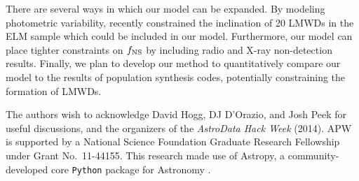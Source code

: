 \documentclass[apjl]{emulateapj}
\begin{document}
There are several ways in which our model can be expanded. By modeling photometric variability, \citet{hermes14} recently constrained the inclination of 20 LMWDs in the ELM sample which could be included in our model. Furthermore, our model can place tighter constraints on $f_{\rm NS}$ by including radio and X-ray non-detection results. Finally, we plan to develop our method to quantitatively compare our model to the results of population synthesis codes, potentially constraining the formation of LMWDs.



\acknowledgements
The authors wish to acknowledge David Hogg, DJ D'Orazio, and Josh Peek for useful discussions, and the organizers of the \emph{AstroData Hack Week} (2014). 
APW is supported by a National Science Foundation Graduate Research Fellowship under Grant No.\ 11-44155. 
This research made use of Astropy, a community-developed core \texttt{Python} package for Astronomy \citep{astropy13}. \\


\end{document}
